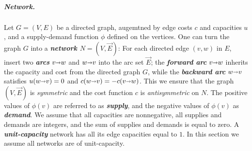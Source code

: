 \documentclass[a4paper,UKenglish]{socg-lipics-v2018}
\def\fsupply{\phi}
\def\arcto{\mathord\shortrightarrow}
\def\arc#1#2{#1\arcto#2}
\theoremstyle{plain}
\numberwithin{figure}{section}
\renewcommand{\paragraph}{\subparagraph}
\def\EMPH#1{\textbf{\emph{\boldmath #1}}}
\begin{document}
\paragraph{Network.}
Let $G=(V,E)$ be a directed graph, augemtned by edge costs $c$ and capacities $u$, and a supply-demand function $\fsupply$ defined on the vertices.
%
One can turn the graph $G$ into a \EMPH{network $N = (V, \vec{E})$}:
For each directed edge $(v,w)$ in $E$, insert two \EMPH{arcs} $\arc vw$ and $\arc wv$ into the arc set $\vec{E}$; the \EMPH{forward arc} $\arc vw$ inherits the capacity and cost from the directed graph $G$,
while the \EMPH{backward arc} $\arc wv$ satisfies $u(\arc wv) = 0$ and $c(\arc wv) = -c(\arc vw)$.  This we ensure that the graph $(V,\vec{E})$ is \emph{symmetric} and the cost function $c$ is \emph{antisymmetric} on $N$.
%
The positive values of $\fsupply(v)$ are referred to as \EMPH{supply}, and the negative values of $\fsupply(v)$ as \EMPH{demand}.
We assume that all capacities are nonnegative, all supplies and demands are integers, and the sum of supplies and demands is equal to zero.
%
A \EMPH{unit-capacity} network has all its edge capacities equal to $1$.
In this section we assume all networks are of unit-capacity.
\end{document}
